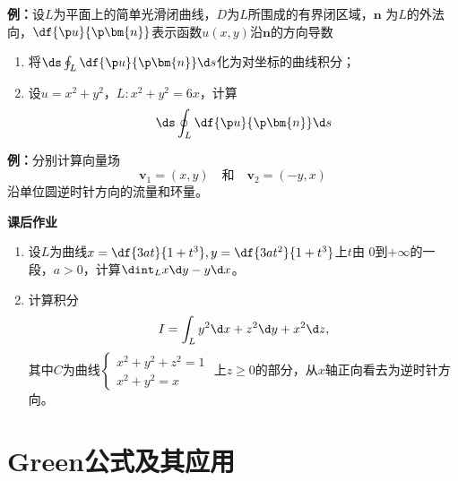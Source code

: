 {\bf 例：}设$L$为平面上的简单光滑闭曲线，$D$为$L$所围成的有界闭区域，$\bm{n}$
为$L$的外法向，$\df{\p u}{\p\bm{n}}$表示函数$u(x,y)$沿$\bm{n}$的方向导数
\begin{enumerate}[(1)]
  \item 将$\ds\oint_L\df{\p u}{\p\bm{n}}\d s$化为对坐标的曲线积分；
  \item 设$u=x^2+y^2$，$L:x^2+y^2=6x$，计算
  $$\ds\oint_L\df{\p u}{\p\bm{n}}\d s$$
\end{enumerate}

{\bf 例：}分别计算向量场
$$\bm{v}_1=(x,y)\quad\mbox{和}\quad \bm{v}_2=(-y,x)$$
沿单位圆逆时针方向的流量和环量。

\begin{ext}
	{\bf 课后作业}
	\begin{enumerate}
	  \item 设$L$为曲线$x=\df{3at}{1+t^3},y=\df{3at^2}{1+t^3}$上$t$由
	  $0$到$+\infty$的一段，$a>0$，计算$\dint_Lx\d y-y\d x$。
	  \item 计算积分
		$$I=\int_Ly^2\d x+z^2\d y+x^2\d z,$$
		其中$C$为曲线$\left\{\begin{array}{l}
		x^2+y^2+z^2=1 \\ x^2+y^2=x
		\end{array}\right.$
		上$z\geq 0$的部分，从$x$轴正向看去为逆时针方向。
	\end{enumerate}
\end{ext}

\section{Green公式及其应用}

